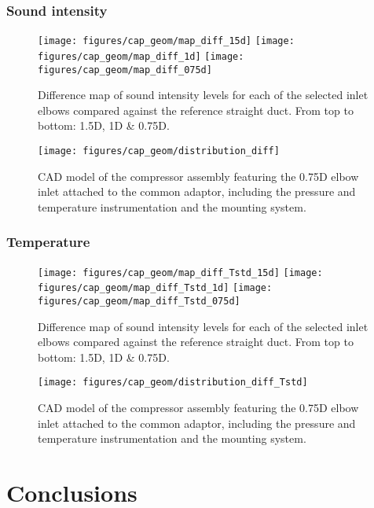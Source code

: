 \subsubsection{Sound intensity}

\begin{figure}[h!]
\centering
\texttt{[image: figures/cap\_geom/map\_diff\_15d]}
\texttt{[image: figures/cap\_geom/map\_diff\_1d]}
\texttt{[image: figures/cap\_geom/map\_diff\_075d]}
\caption{Difference map of sound intensity levels for each of the selected inlet elbows compared against the reference straight duct. From top to bottom: 1.5D, 1D \& 0.75D.}
\label{fig:map_diff_075d}
\end{figure}

\begin{figure}[h!]
\centering
\texttt{[image: figures/cap\_geom/distribution\_diff]}
\caption{CAD model of the compressor assembly featuring the 0.75D elbow inlet attached to the common adaptor, including the pressure and temperature instrumentation and the mounting system.}
\label{fig:distribution_diff}
\end{figure}

\subsubsection{Temperature}

\begin{figure}[h!]
\centering
\texttt{[image: figures/cap\_geom/map\_diff\_Tstd\_15d]}
\texttt{[image: figures/cap\_geom/map\_diff\_Tstd\_1d]}
\texttt{[image: figures/cap\_geom/map\_diff\_Tstd\_075d]}
\caption{Difference map of sound intensity levels for each of the selected inlet elbows compared against the reference straight duct. From top to bottom: 1.5D, 1D \& 0.75D.}
\label{fig:map_diff_075d}
\end{figure}

\begin{figure}[h!]
\centering
\texttt{[image: figures/cap\_geom/distribution\_diff\_Tstd]}
\caption{CAD model of the compressor assembly featuring the 0.75D elbow inlet attached to the common adaptor, including the pressure and temperature instrumentation and the mounting system.}
\label{fig:distribution_diff}
\end{figure}

\section{Conclusions}